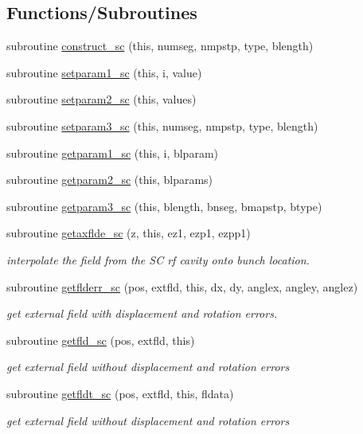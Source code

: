 \subsection*{Functions/\+Subroutines}
\begin{DoxyCompactItemize}
\item 
subroutine \mbox{\hyperlink{namespacescclass_a117b083b5a5a59d050fe5c0a4771332b}{construct\+\_\+sc}} (this, numseg, nmpstp, type, blength)
\item 
subroutine \mbox{\hyperlink{namespacescclass_a23a57a64ee6a74149bbc9cf009ce8711}{setparam1\+\_\+sc}} (this, i, value)
\item 
subroutine \mbox{\hyperlink{namespacescclass_af35b79ac06dc2b6bec2d97f6e745ab20}{setparam2\+\_\+sc}} (this, values)
\item 
subroutine \mbox{\hyperlink{namespacescclass_a656d4cc4d5fe872ffa9df12bab721bec}{setparam3\+\_\+sc}} (this, numseg, nmpstp, type, blength)
\item 
subroutine \mbox{\hyperlink{namespacescclass_a5f02207aa4bb28b292bf39bd5876c7e2}{getparam1\+\_\+sc}} (this, i, blparam)
\item 
subroutine \mbox{\hyperlink{namespacescclass_a036860e8ca9dff4cc79e19ec6c55f86a}{getparam2\+\_\+sc}} (this, blparams)
\item 
subroutine \mbox{\hyperlink{namespacescclass_aaa829fed79c7f89ac09b012687895817}{getparam3\+\_\+sc}} (this, blength, bnseg, bmapstp, btype)
\item 
subroutine \mbox{\hyperlink{namespacescclass_aefc9ea62cf36830e2c74869fff2f1b17}{getaxflde\+\_\+sc}} (z, this, ez1, ezp1, ezpp1)
\begin{DoxyCompactList}\small\item\em interpolate the field from the SC rf cavity onto bunch location. \end{DoxyCompactList}\item 
subroutine \mbox{\hyperlink{namespacescclass_abe42c84df8190cc0443752dff296dd89}{getflderr\+\_\+sc}} (pos, extfld, this, dx, dy, anglex, angley, anglez)
\begin{DoxyCompactList}\small\item\em get external field with displacement and rotation errors. \end{DoxyCompactList}\item 
subroutine \mbox{\hyperlink{namespacescclass_a5af81e94b531e8d02789525f1f4438ac}{getfld\+\_\+sc}} (pos, extfld, this)
\begin{DoxyCompactList}\small\item\em get external field without displacement and rotation errors \end{DoxyCompactList}\item 
subroutine \mbox{\hyperlink{namespacescclass_a73840f6e9b85c73425db1f08ab539aa2}{getfldt\+\_\+sc}} (pos, extfld, this, fldata)
\begin{DoxyCompactList}\small\item\em get external field without displacement and rotation errors \end{DoxyCompactList}\end{DoxyCompactItemize}
